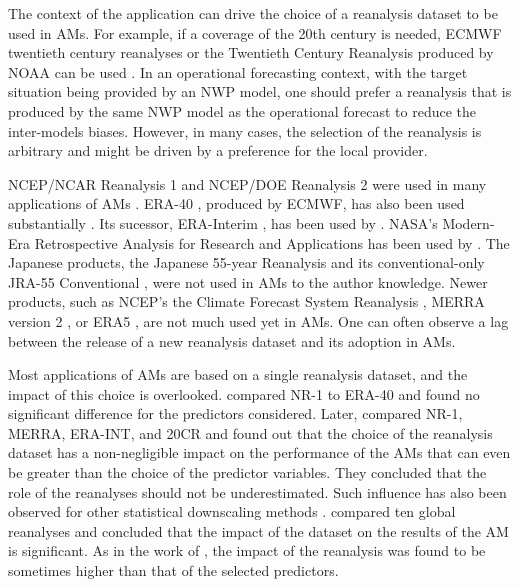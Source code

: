 \documentclass[alpha-refs]{wiley-article}
\begin{document}
The context of the application can drive the choice of a reanalysis dataset to be used in AMs. For example, if a coverage of the 20th century is needed, ECMWF twentieth century reanalyses \citep[ERA-20C or CERA-20C --][]{Poli2016, Laloyaux2016} or the Twentieth Century Reanalysis \citep[20CR --][]{Compo2011} produced by NOAA can be used \citep[for example,][]{Kuentz2015, Caillouet2016, Brigode2016, Bonnet2017}. In an operational forecasting context, with the target situation being provided by an NWP model, one should prefer a reanalysis that is produced by the same NWP model as the operational forecast to reduce the inter-models biases. However, in many cases, the selection of the reanalysis is arbitrary and might be driven by a preference for the local provider.  

NCEP/NCAR Reanalysis 1 \citep[NR-1 --][]{Kalnay1996, Kistler2001} and NCEP/DOE Reanalysis 2 \citep[NR-2 --][]{Kanamitsu2002} were used in many applications of AMs \citep[e.g.][]{Timbal2003, Altava-Ortiz2006, Matulla2007, Yiou2014}. ERA-40 \citep{Uppala2005}, produced by ECMWF, has also been used substantially \citep[e.g.][] {Willems2011b, Radanovics2013, Chardon2014, BenDaoud2016}. Its sucessor, ERA-Interim \citep[ERA-INT --][]{Dee2011a}, has been used by \cite{Raynaud2016b}. NASA's Modern-Era Retrospective Analysis for Research and Applications \citep[MERRA -- ][]{Rienecker2011} has been used by \citet{Vanvyve2015}. The Japanese products, the Japanese 55-year Reanalysis \citep[JRA-55 --][]{Kobayashi2015, Harada2016} and its conventional-only JRA-55 Conventional \citep[JRA-55C --][]{Kobayashi2014}, were not used in AMs to the author knowledge. Newer products, such as NCEP's the Climate Forecast System Reanalysis \citep[CFSR --][]{Saha2010a}, MERRA version 2 \citep[MERRA-2 -- ][]{Gelaro2017}, or ERA5 \citep{Hersbach2019}, are not much used yet in AMs. One can often observe a lag between the release of a new reanalysis dataset and its adoption in AMs.

Most applications of AMs are based on a single reanalysis dataset, and the impact of this choice is overlooked. \citet{BenDaoud2009} compared NR-1 to ERA-40 and found no significant difference for the predictors considered. Later, \citet{Dayon2015} compared NR-1, MERRA, ERA-INT, and 20CR and found out that the choice of the reanalysis dataset has a non-negligible impact on the performance of the AMs that can even be greater than the choice of the predictor variables. They concluded that the role of the reanalyses should not be underestimated. Such influence has also been observed for other statistical downscaling methods \citep[e.g.][]{Koukidis2009}. \citet{Horton2018b} compared ten global reanalyses and concluded that the impact of the dataset on the results of the AM is significant. As in the work of \citet{Dayon2015}, the impact of the reanalysis was found to be sometimes higher than that of the selected predictors. 
\end{document}
